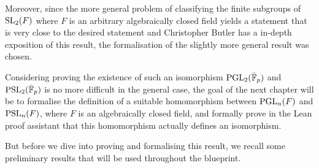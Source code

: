 Moreover, since the more general problem of classifying the finite subgroups of $\operatorname{SL}_2(F)$ where $F$ is an arbitrary algebraically closed field
yields a statement that is very close to the desired statement and Christopher Butler has a in-depth exposition of this result, the formalisation of the slightly more general result was chosen.

Considering proving the existence of such an isomorphism $\operatorname{PGL}_2(\bar{\mathbb{F}}_p)$ and $\operatorname{PSL}_2(\bar{\mathbb{F}}_p)$ is no more difficult in the general case, 
the goal of the next chapter will be to formalise the definition of a suitable homomorphism between $\operatorname{PGL}_n(F)$ and $\operatorname{PSL}_n(F)$, where $F$ is an algebraically closed field, 
and formally prove in the Lean proof assistant that this homomorphism actually defines an isomorphism.

But before we dive into proving and formalising this result, we recall some preliminary results that will be used throughout the blueprint.